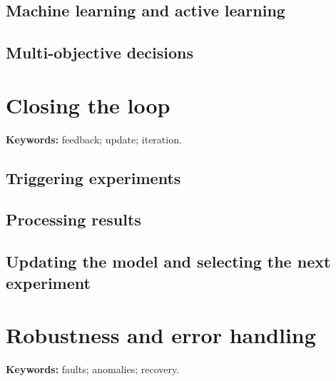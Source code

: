 \subsection{Machine learning and active learning}


\subsection{Multi-objective decisions}


\section{Closing the loop}

\begin{methodbox}
\textbf{Keywords:} feedback; update; iteration.
\end{methodbox}

\subsection{Triggering experiments}


\subsection{Processing results}


\subsection{Updating the model and selecting the next experiment}


\section{Robustness and error handling}

\begin{warningbox}
\textbf{Keywords:} faults; anomalies; recovery.
\end{warningbox}

